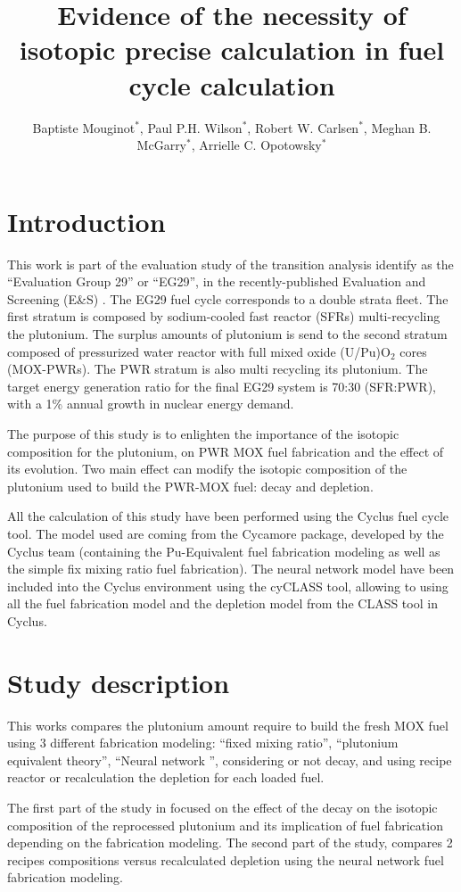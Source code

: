 \documentclass{anstrans}
\title{Evidence of the necessity of isotopic precise calculation in fuel cycle
calculation}
\author{Baptiste Mouginot$^{*}$, Paul P.H. Wilson$^{*}$, Robert W. Carlsen$^{*}$, Meghan B. McGarry$^{*}$,
Arrielle C. Opotowsky$^{*}$ }
\institute{
$^{*}$University of Wisconsin-Madison, WI
\and
}
\begin{document}
\section{Introduction} 

This work is part of the evaluation study of the transition analysis
\cite{Bo} identify as the ``Evaluation Group 29'' or ``EG29'', in the
recently-published Evaluation and Screening (E\&S) \cite{ES}.  The EG29 fuel
cycle corresponds to a double strata fleet. The first stratum is composed by
sodium-cooled fast reactor (SFRs) multi-recycling the plutonium. The surplus
amounts of plutonium is send to the second stratum composed of pressurized water
reactor with full mixed oxide (U/Pu)O$_{2}$ cores (MOX-PWRs).  The PWR stratum
is also multi recycling its plutonium. The target energy generation ratio for
the final EG29 system is 70:30 (SFR:PWR), with a 1\% annual growth in nuclear
energy demand.

The purpose of this study is to enlighten the importance of the isotopic
composition for the plutonium, on PWR MOX fuel fabrication and the effect of its
evolution. Two main effect can modify the isotopic composition of the plutonium
used to build the PWR-MOX fuel: decay and depletion.

All the calculation of this study have been performed using the Cyclus fuel cycle
tool\cite{CYCLUS}. The model used are coming from the Cycamore package, developed by the
Cyclus team (containing the Pu-Equivalent fuel fabrication modeling as well as
the simple fix mixing ratio fuel fabrication). The neural network model have
been included into the Cyclus environment using the cyCLASS tool, allowing to
using all the fuel fabrication model and the depletion model from the CLASS tool
\cite{CLASS} in Cyclus.

\section{Study description}
This works compares the plutonium amount require to build the fresh MOX fuel
using 3 different fabrication modeling: ``fixed mixing ratio'', ``plutonium
equivalent theory'', ``Neural network \cite{Leniau2015125}'', considering or not
decay, and using recipe reactor or recalculation the depletion for each loaded
fuel.

The first part of the study in focused on the effect of the decay on the
isotopic composition of the reprocessed plutonium and its implication of fuel
fabrication depending on the fabrication modeling.
The second part of the study, compares 2 recipes compositions versus recalculated
depletion using the neural network fuel fabrication modeling. 
\end{document}
